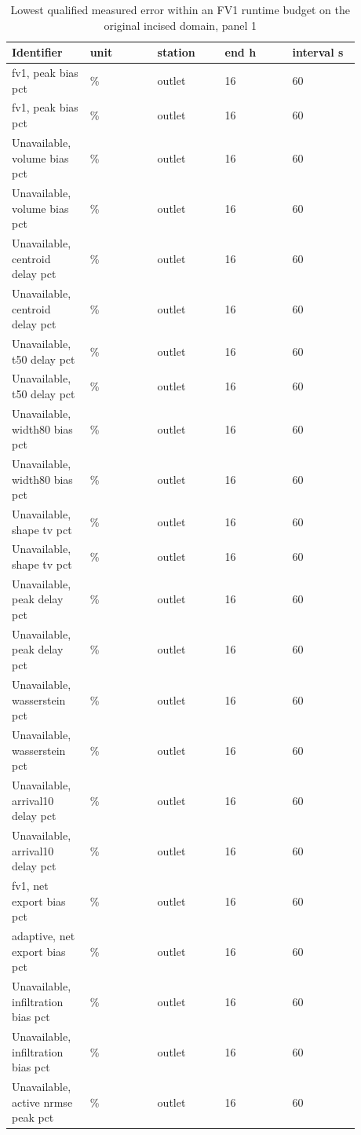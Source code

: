 \begingroup
\small
\setlength{\tabcolsep}{2pt}
\begin{longtable}{p{0.1760\linewidth}p{0.1760\linewidth}p{0.1760\linewidth}p{0.1760\linewidth}p{0.1760\linewidth}}
\caption{Lowest qualified measured error within an FV1 runtime budget on the original incised domain, panel 1}\\
\hline
Identifier & unit & station & end h & interval s \\
\hline\endhead
fv1, peak bias pct & \% & outlet & 16 & 60 \\
fv1, peak bias pct & \% & outlet & 16 & 60 \\
Unavailable, volume bias pct & \% & outlet & 16 & 60 \\
Unavailable, volume bias pct & \% & outlet & 16 & 60 \\
Unavailable, centroid delay pct & \% & outlet & 16 & 60 \\
Unavailable, centroid delay pct & \% & outlet & 16 & 60 \\
Unavailable, t50 delay pct & \% & outlet & 16 & 60 \\
Unavailable, t50 delay pct & \% & outlet & 16 & 60 \\
Unavailable, width80 bias pct & \% & outlet & 16 & 60 \\
Unavailable, width80 bias pct & \% & outlet & 16 & 60 \\
Unavailable, shape tv pct & \% & outlet & 16 & 60 \\
Unavailable, shape tv pct & \% & outlet & 16 & 60 \\
Unavailable, peak delay pct & \% & outlet & 16 & 60 \\
Unavailable, peak delay pct & \% & outlet & 16 & 60 \\
Unavailable, wasserstein pct & \% & outlet & 16 & 60 \\
Unavailable, wasserstein pct & \% & outlet & 16 & 60 \\
Unavailable, arrival10 delay pct & \% & outlet & 16 & 60 \\
Unavailable, arrival10 delay pct & \% & outlet & 16 & 60 \\
fv1, net export bias pct & \% & outlet & 16 & 60 \\
adaptive, net export bias pct & \% & outlet & 16 & 60 \\
Unavailable, infiltration bias pct & \% & outlet & 16 & 60 \\
Unavailable, infiltration bias pct & \% & outlet & 16 & 60 \\
Unavailable, active nrmse peak pct & \% & outlet & 16 & 60 \\

\end{longtable}
